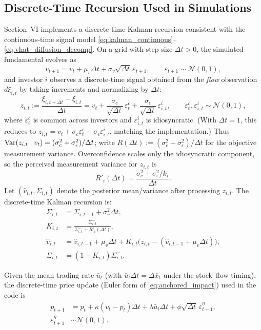 \subsection{Discrete-Time Recursion Used in Simulations}

Section~VI implements a discrete-time Kalman recursion consistent with the continuous-time signal model \eqref{eq:kalman_continuous}--\eqref{eq:vhat_diffusion_decomp}. On a grid with step size $\Delta t>0$, the simulated fundamental evolves as
\[
v_{t+1}=v_t+\mu_v\Delta t+\sigma_v\sqrt{\Delta t}\,\varepsilon_{t+1},\qquad \varepsilon_{t+1}\sim\mathcal N(0,1),
\]
and investor $i$ observes a discrete-time signal obtained from the \emph{flow} observation $d\xi_{i,t}$ by taking increments and normalizing by $\Delta t$:
\[
z_{i,t}:=\frac{\xi_{i,t+\Delta t}-\xi_{i,t}}{\Delta t}
=v_t+\frac{\sigma_c}{\sqrt{\Delta t}}\,\varepsilon^c_t+\frac{\sigma_\epsilon}{\sqrt{\Delta t}}\,\varepsilon^i_{i,t},
\qquad \varepsilon^c_t,\varepsilon^i_{i,t}\sim\mathcal N(0,1),
\]
where $\varepsilon^c_t$ is common across investors and $\varepsilon^i_{i,t}$ is idiosyncratic. (With $\Delta t=1$, this reduces to $z_{i,t}=v_t+\sigma_c\varepsilon^c_t+\sigma_\epsilon\varepsilon^i_{i,t}$, matching the implementation.)
Thus $\text{Var}(z_{i,t}\mid v_t)=(\sigma_c^2+\sigma_\epsilon^2)/\Delta t$; write $R(\Delta t):=(\sigma_c^2+\sigma_\epsilon^2)/\Delta t$ for the objective measurement variance.
Overconfidence scales only the idiosyncratic component, so the perceived measurement variance for $z_{i,t}$ is
\[
R'_i(\Delta t)=\frac{\sigma_c^2+\sigma_\epsilon^2/k_i}{\Delta t}.
\]
Let $(\hat v_{i,t},\Sigma_{i,t})$ denote the posterior mean/variance after processing $z_{i,t}$. The discrete-time Kalman recursion is:
 \begin{align*}
  \Sigma^-_{i,t} &= \Sigma_{i,t-1}+\sigma_v^2\Delta t,\\
 K_{i,t} &= \frac{\Sigma^-_{i,t}}{\Sigma^-_{i,t}+R'_i(\Delta t)},\\
  \hat v_{i,t} &= \hat v_{i,t-1}+\mu_v\Delta t+K_{i,t}\bigl(z_{i,t}-(\hat v_{i,t-1}+\mu_v\Delta t)\bigr),\\
  \Sigma_{i,t} &= (1-K_{i,t})\Sigma^-_{i,t}.
 \end{align*}
 
 Given the mean trading rate $\bar u_t$ (with $\bar u_t\Delta t=\Delta\bar x_t$ under the stock--flow timing), the discrete-time price update (Euler form of \eqref{eq:anchored_impact}) used in the code is
 \[
\begin{aligned}
 p_{t+1}
 &= p_t+\kappa(v_t-p_t)\Delta t+\lambda \bar u_t\Delta t + \phi \sqrt{\Delta t}\,\varepsilon^\eta_{t+1},\\
 \varepsilon^\eta_{t+1}&\sim\mathcal N(0,1).
\end{aligned}
 \]

